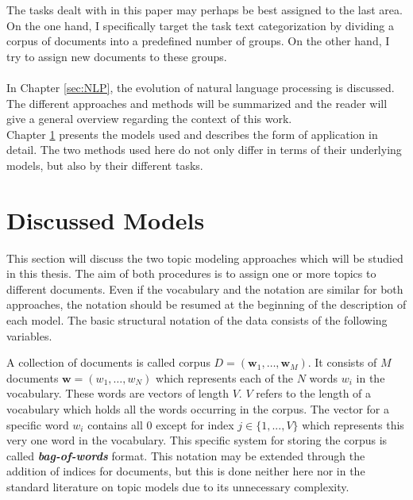 \documentclass[11pt,a4paper]{article}
\begin{document}
The tasks dealt with in this paper may perhaps be best assigned to the last area. On the one hand, I specifically target the task text categorization by dividing a corpus of documents into a predefined number of groups. On the other hand, I try to assign new documents to these groups.\\
\ \\
In Chapter \ref{sec:NLP}, the evolution of natural language processing is discussed. The different approaches and methods will be summarized and the reader will give a general overview regarding the context of this work.\\
Chapter \ref{sec:Models} presents the models used and describes the form of application in detail. The two methods used here do not only differ in terms of their underlying models, but also by their different tasks.












\section{Discussed Models} \label{sec:Models}

This section will discuss the two topic modeling approaches which will be studied in this thesis. The aim of both procedures is to assign one or more topics to different documents. Even if the vocabulary and the notation are similar for both approaches, the notation should be resumed at the beginning of the description of each model. The basic structural notation of the data consists of the following variables.

A collection of documents is called corpus $D=(\textbf{w}_1,\dots , \textbf{w}_M)$. It consists of $M$ documents $\textbf{w}=(w_1,\dots, w_N)$ which represents each of the $N$ words $w_i$ in the vocabulary. These words are vectors of length $V$. $V$ refers to the length of a vocabulary which holds all the words occurring in the corpus. The vector for a specific word $w_i$ contains all 0 except for index $j\in\{1,...,V\}$ which represents this very one word in the vocabulary. This specific system for storing the corpus is called \textbf{\textit{bag-of-words}} format.
This notation may be extended through the addition of indices for documents, but this is done neither here nor in the standard literature on topic models due to its unnecessary complexity.
\end{document}
